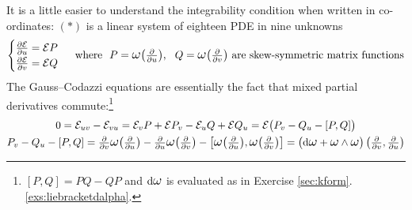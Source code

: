 It is a little easier to understand the integrability condition when written in co-ordinates: $(\ast)$ is a linear system of eighteen PDE in nine unknowns
\[
	\begin{cases}
		\partials[\cE]{u}=\cE P\\
		\partials[\cE]{v}=\cE Q
	\end{cases}
	\ \text{where }\ 
	P=\lomega\bigl(\textstyle\partials u\bigr),\ \ Q=\lomega\bigl(\textstyle\partials v\bigr) \text{ are skew-symmetric matrix functions}
\]
The Gauss--Codazzi equations are essentially the fact that mixed partial derivatives commute:\footnote{$[P,Q]=PQ-QP$ and $\D\lomega$ is evaluated as in Exercise \ref{sec:kform}.\ref{exs:liebracketdalpha}.}
\begin{gather*}
	0=\cE_{uv}-\cE_{vu}=\cE_vP+\cE P_v- \cE_uQ+\cE Q_u=\cE\bigl(P_v-Q_u-[P,Q]\bigr)\\
	P_v-Q_u-[P,Q] =\textstyle\partials v\lomega\bigl(\partials u\bigr)-\partials u\lomega\bigl(\partials v\bigr)-\bigl[\lomega\bigl(\partials u\bigr),\lomega\bigl(\partials v\bigr)\bigr] =\bigl(\D\lomega+\lomega\wedge\lomega\bigr)\left(\partials v,\partials u\right)
\end{gather*}

\goodbreak

